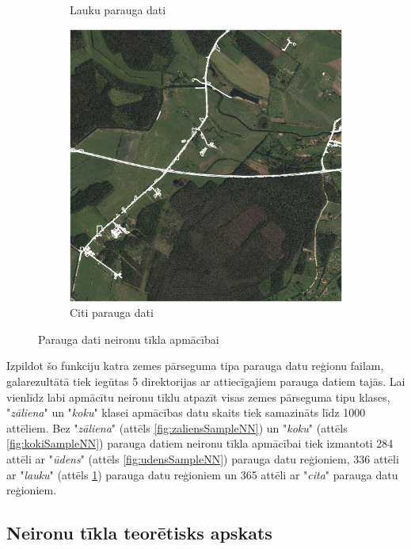 \documentclass[12pt,paper=a4]{report}
\begin{document}
\begin{figure}[h!]
\begin{subfigure}[b]{.32\linewidth}
\caption{Lauku parauga dati}\label{fig:lauksSampleNN}
\end{subfigure}
\begin{subfigure}[b]{.32\linewidth}
\includegraphics[width=\linewidth]{citsSampleNN}
\caption{Citi parauga dati}\label{fig:citsSampleNN}
\end{subfigure}
\label{fig:sampleNN}
\caption{Parauga dati neironu tīkla apmācībai}
\end{figure}\par
Izpildot šo funkciju katra zemes pārseguma tipa parauga datu reģionu failam, galarezultātā tiek iegūtas 5 direktorijas ar attiecīgajiem parauga datiem tajās. Lai vienlīdz labi apmācītu neironu tīklu atpazīt visas zemes pārseguma tipu klases, "\textit{zāliena}" un "\textit{koku}" klasei apmācības datu skaits tiek samazināts līdz 1000 attēliem. Bez "\textit{zāliena}" (attēls \ref{fig:zaliensSampleNN}) un "\textit{koku}" (attēls \ref{fig:kokiSampleNN}) parauga datiem neironu tīkla apmācībai tiek izmantoti 284 attēli ar "\textit{ūdens}" (attēls \ref{fig:udensSampleNN}) parauga datu reģioniem, 336 attēli ar "\textit{lauku}" (attēls \ref{fig:lauksSampleNN}) parauga datu reģioniem un 365 attēli ar "\textit{cita}" parauga datu reģioniem.
\subsection{Neironu tīkla teorētisks apskats}
\end{document}
